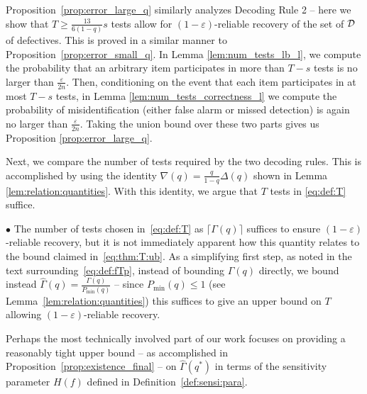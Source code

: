 \documentclass[onecolumn,letterpaper]{IEEEtran}
\newcommand{\cD}{{\cal D}}
\newcommand{\cp}{{q}}
\newcommand{\mo}{{s}}
\newcommand{\pmin}{{P_{\min}(\cp)}}
\newcommand{\pgap}{{\Delta(\cp)}}
\newcommand{\cpn}{{\cp^*}}
\newcommand{\pgapm}{{\nabla(\cp)}}
\newcommand{\fH}{{H(f)}}
\newcommand{\ftau}{{\Gamma}}
\newcommand{\ftaup}{{\hat{\Gamma}}}
\newcommand{\fT}{{\ftau(\cp)}}
\newcommand{\fTp}{\ftaup (\cp)}
\newcommand{\fTpn}{\ftaup (\cpn)}
\newcommand{\xw}[1]{\textcolor{cyan}{#1}}
\begin{document}
Proposition~\ref{prop:error_large_q} similarly analyzes Decoding Rule 2 -- here we show that $T \geq \frac{13}{6(1-\cp)} \mo$ tests allow for $(1-\varepsilon)$-reliable recovery of the set of $\cD$ of defectives. This is proved in a similar manner to Proposition~\ref{prop:error_small_q}. In Lemma \ref{lem:num_tests_lb_l}, we compute the probability that an arbitrary item participates in more than $T-\mo$ tests is no larger than $\frac{\varepsilon}{2n}$. Then, conditioning on the event that each item participates in at most $T-\mo$ tests, in Lemma \ref{lem:num_tests_correctness_l} we compute the probability of misidentification (either false alarm or missed detection) is again no larger than $\frac{\varepsilon}{2n}$. Taking the union bound over these two parts gives us Proposition \ref{prop:error_large_q}. 

Next, we compare the number of tests required by the two decoding rules. This is accomplished by using the identity $\pgapm = \frac{\cp}{1-\cp} \pgap$ shown in Lemma \ref{lem:relation:quantities}. With this identity, we argue that $T$ tests in \eqref{eq:def:T} suffice. %



$\bullet$ 
The number of tests chosen in~\eqref{eq:def:T} as $\lceil \fT \rceil$ suffices to ensure $(1-\varepsilon)$-reliable recovery, but it is not immediately apparent how this quantity relates to the bound claimed in~\eqref{eq:thm:T:ub}. As a simplifying first step, as noted in the text surrounding~\eqref{eq:def:fTp}, 
instead of bounding $\fT$ directly, we bound instead $\fTp = \frac{\fT}{\pmin}$ -- since $\pmin \leq 1$ (see Lemma~\ref{lem:relation:quantities}) this suffices to give an upper bound on $T$ allowing $(1-\varepsilon)$-reliable recovery.

Perhaps the most technically involved part of our work focuses on providing a reasonably tight upper bound -- as accomplished in Proposition~\ref{prop:existence_final} -- on $\fTpn$ in terms of the sensitivity parameter $\fH$ defined in Definition~\ref{def:sensi:para}.
\end{document}
